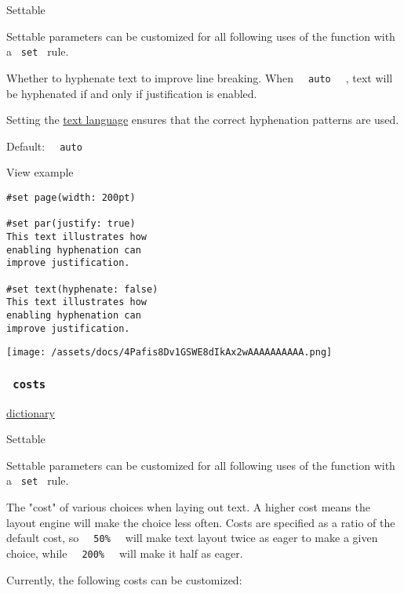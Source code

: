 {{ Settable }}

\label{parameters-hyphenate-settable-tooltip}
Settable parameters can be customized for all following uses of the
function with a \texttt{\ set\ } rule.

Whether to hyphenate text to improve line breaking. When
\texttt{\ }{\texttt{\ auto\ }}\texttt{\ } , text will be hyphenated if
and only if justification is enabled.

Setting the \href{/docs/reference/text/text/\#parameters-lang}{text
language} ensures that the correct hyphenation patterns are used.

Default: \texttt{\ }{\texttt{\ auto\ }}\texttt{\ }


View example

\begin{verbatim}
#set page(width: 200pt)

#set par(justify: true)
This text illustrates how
enabling hyphenation can
improve justification.

#set text(hyphenate: false)
This text illustrates how
enabling hyphenation can
improve justification.
\end{verbatim}

\texttt{[image: /assets/docs/4Pafis8Dv1GSWE8dIkAx2wAAAAAAAAAA.png]}

\subsubsection{\texorpdfstring{\texttt{\ costs\ }}{ costs }}\label{parameters-costs}

\href{/docs/reference/foundations/dictionary/}{dictionary}

{{ Settable }}

\label{parameters-costs-settable-tooltip}
Settable parameters can be customized for all following uses of the
function with a \texttt{\ set\ } rule.

The "cost" of various choices when laying out text. A higher cost means
the layout engine will make the choice less often. Costs are specified
as a ratio of the default cost, so
\texttt{\ }{\texttt{\ 50\%\ }}\texttt{\ } will make text layout twice as
eager to make a given choice, while
\texttt{\ }{\texttt{\ 200\%\ }}\texttt{\ } will make it half as eager.

Currently, the following costs can be customized:

